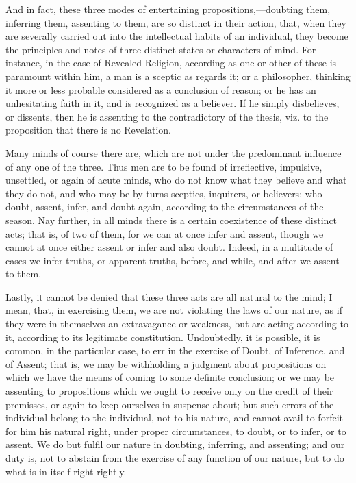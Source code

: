 And in fact, these three modes of entertaining propositions,—doubting
them, inferring them, assenting to them, are so distinct in their
action, that, when they are severally carried out into the
intellectual habits of an individual, they become the principles and
notes of three distinct states or characters of mind. For instance, in
the case of Revealed Religion, according as one or other of these is
paramount within him, a man is a sceptic as regards it; or a
philosopher, thinking it more or less probable considered as a
conclusion of reason; or he has an unhesitating faith in it, and is
recognized as a believer. If he simply disbelieves, or dissents, then
he is assenting to the contradictory of the thesis, viz. to the
proposition that there is no Revelation.

Many minds of course there are, which are not under the predominant
influence of any one of the three. Thus men are to be found of
irreflective, impulsive, unsettled, or again of acute minds, who do
not know what they believe and what they do not, and who may be by
turns sceptics, inquirers, or believers; who doubt, assent, infer, and
doubt again, according to the circumstances of the season. Nay
further, in all minds there is a certain coexistence of these distinct
acts; that is, of two of them, for we can at once infer and assent,
though we cannot at once either assent or infer and also doubt.
Indeed, in a multitude of cases we infer truths, or apparent truths,
before, and while, and after we assent to them.

Lastly, it cannot be denied that these three acts are all natural
to the mind; I mean, that, in exercising them, we are not
violating the laws of our nature, as if they were in themselves an
extravagance or weakness, but are acting according to it, according to
its legitimate constitution. Undoubtedly, it is possible, it is
common, in the particular case, to err in the exercise of Doubt, of
Inference, and of Assent; that is, we may be withholding a judgment
about propositions on which we have the means of coming to some
definite conclusion; or we may be assenting to propositions which we
ought to receive only on the credit of their premisses, or again to
keep ourselves in suspense about; but such errors of the individual
belong to the individual, not to his nature, and cannot avail to
forfeit for him his natural right, under proper circumstances, to
doubt, or to infer, or to assent. We do but fulfil our nature in
doubting, inferring, and assenting; and our duty is, not to abstain
from the exercise of any function of our nature, but to do what is in
itself right rightly.

